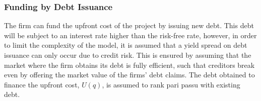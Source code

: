 \documentclass[../main.tex]{subfiles}
\begin{document}
    \subsubsection{Funding by Debt Issuance}
        \label{sec:marginal-valuation-debt-issuance}
        The firm can fund the upfront cost of the project by issuing new debt.
        This debt will be subject to an interest rate higher than the risk-free rate, 
        however, in order to limit the complexity of the model, 
        it is assumed that a yield spread on debt issuance can only occur due to credit risk. 
        This is ensured by assuming that the market where the firm obtains its debt is fully efficient, 
        such that creditors break even by offering the market value of the firms' debt claims.
        The debt obtained to finance the upfront cost, $U(q)$, is assumed to rank pari passu with existing debt.
\end{document}
